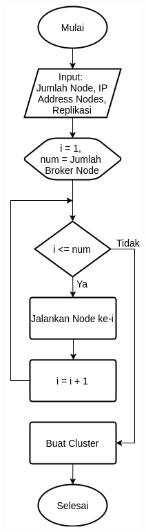 \begin{figure}[!]
	\centering
	\begin{subfigure}[t]{0.3\textwidth}
		\centering
		\includegraphics[width=\textwidth]{Resources/Images/test-flowchart-normal-global-broker}

\end{subfigure}
\end{figure}
